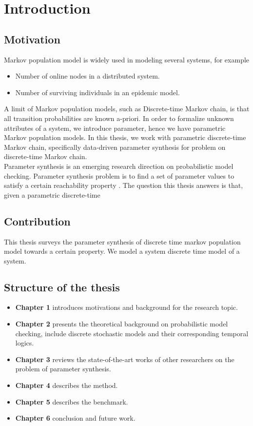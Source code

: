 \chapter{Introduction}
\section{Motivation}

Markov population model is widely used in modeling several systems, for example
\begin{itemize}
      \item Number of online nodes in a distributed system.
      \item Number of surviving individuals in an epidemic model.
\end{itemize}

A limit of Markov population models, such as Discrete-time Markov chain, is that all transition probabilities are known a-priori. In order to formalize unknown attributes of a system, we introduce parameter, hence we have parametric Markov population models. In this thesis, we work with parametric discrete-time Markov chain, specifically data-driven parameter synthesis for problem on discrete-time Markov chain.\\

Parameter synthesis is an emerging research direction on probabilistic model checking. Parameter synthesis problem is to find a set of parameter values to satisfy a certain reachability property \cite{katoen2016probabilistic}. The question this thesis answers is that, given a parametric discrete-time



\section{Contribution}
This thesis surveys the parameter synthesis of discrete time markov population model towards a certain property.
We model a system discrete time model of a system.

\section{Structure of the thesis}

\begin{itemize}
      \item \textbf{Chapter 1} introduces motivations and background for the research topic.
      \item \textbf{Chapter 2} presents the theoretical background on probabilistic model checking, include discrete stochastic models and their corresponding temporal logics.
      \item \textbf{Chapter 3} reviews the state-of-the-art works of other researchers
            on the problem of parameter synthesis.
      \item \textbf{Chapter 4} describes the method.
      \item \textbf{Chapter 5} describes the benchmark.
      \item \textbf{Chapter 6} conclusion and future work.
\end{itemize}

